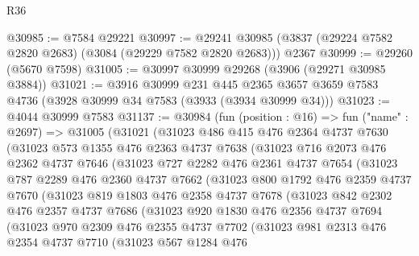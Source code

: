 \begin{lexlean}{R36}
\begin{coremodule}
@30985 := @7584 @29221
@30997 := @29241 @30985 (@3837 (@29224 @7582 @2820 @2683) (@3084 (@29229 @7582 @2820 @2683))) @2367
@30999 := @29260 (@5670 @7598)
@31005 := @30997 @30999 @29268 (@3906 (@29271 @30985 @3884))
@31021 := @3916
    @30999
    @231
    @445
    @2365
    @3657
    @3659
    @7583
    @4736
    (@3928 @30999 @34 @7583 (@3933 (@3934 @30999 @34)))
@31023 := @4044 @30999 @7583
@31137 := @30984
    (fun (position : @16) =>
    fun ("name" : @2697) =>
    @31005
      (@31021
        (@31023
          @486
          @415
          @476
          @2364
          @4737
          @7630
          (@31023
            @573
            @1355
            @476
            @2363
            @4737
            @7638
            (@31023
              @716
              @2073
              @476
              @2362
              @4737
              @7646
              (@31023
                @727
                @2282
                @476
                @2361
                @4737
                @7654
                (@31023
                  @787
                  @2289
                  @476
                  @2360
                  @4737
                  @7662
                  (@31023
                    @800
                    @1792
                    @476
                    @2359
                    @4737
                    @7670
                    (@31023
                      @819
                      @1803
                      @476
                      @2358
                      @4737
                      @7678
                      (@31023
                        @842
                        @2302
                        @476
                        @2357
                        @4737
                        @7686
                        (@31023
                          @920
                          @1830
                          @476
                          @2356
                          @4737
                          @7694
                          (@31023
                            @970
                            @2309
                            @476
                            @2355
                            @4737
                            @7702
                            (@31023
                              @981
                              @2313
                              @476
                              @2354
                              @4737
                              @7710
                              (@31023
                                @567
                                @1284
                                @476

\end{coremodule}
\end{lexlean}
